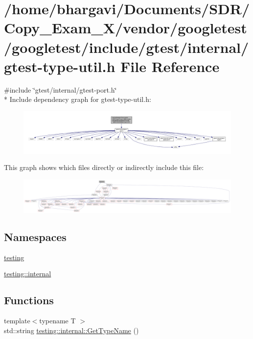 \hypertarget{gtest-type-util_8h}{}\section{/home/bhargavi/\+Documents/\+S\+D\+R/\+Copy\+\_\+\+Exam\+\_\+X/vendor/googletest/googletest/include/gtest/internal/gtest-\/type-\/util.h File Reference}
\label{gtest-type-util_8h}
{\ttfamily \#include \char`\"{}gtest/internal/gtest-\/port.\+h\char`\"{}}\\*
Include dependency graph for gtest-\/type-\/util.h\+:
\nopagebreak
\begin{figure}[H]
\begin{center}
\leavevmode
\includegraphics[width=350pt]{gtest-type-util_8h__incl}
\end{center}
\end{figure}
This graph shows which files directly or indirectly include this file\+:
\nopagebreak
\begin{figure}[H]
\begin{center}
\leavevmode
\includegraphics[width=350pt]{gtest-type-util_8h__dep__incl}
\end{center}
\end{figure}
\subsection*{Namespaces}
\begin{DoxyCompactItemize}
\item 
 \hyperlink{namespacetesting}{testing}
\item 
 \hyperlink{namespacetesting_1_1internal}{testing\+::internal}
\end{DoxyCompactItemize}
\subsection*{Functions}
\begin{DoxyCompactItemize}
\item 
{\footnotesize template$<$typename T $>$ }\\std\+::string \hyperlink{namespacetesting_1_1internal_a635606b4731f843c86ec8ca51cab83a1}{testing\+::internal\+::\+Get\+Type\+Name} ()
\end{DoxyCompactItemize}
